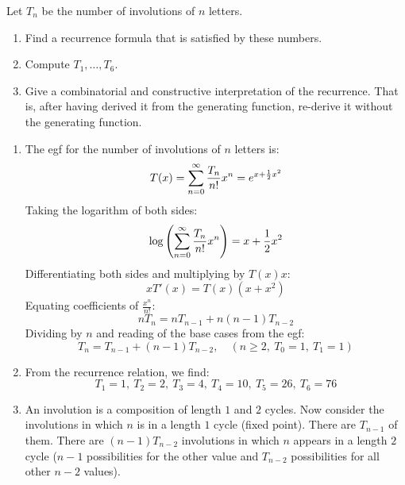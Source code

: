 \begin{exercise}
    \label{ex:3-5}
    Let $T_n$ be the number of involutions of $n$ letters.
    \begin{enumerate}[label=(\alph*)]
        \item Find a recurrence formula that is satisfied by these numbers.
        \item Compute $T_1,\ldots,T_6$.
        \item Give a combinatorial and constructive interpretation of the recurrence. That is, after having derived it from the generating function, re-derive it without the generating function.
    \end{enumerate}
\end{exercise}
\begin{solution}
    \begin{enumerate}[label=(\alph*)]
        \item The egf for the number of involutions of $n$ letters is:
        \[
            T(x) = \bsum[n] \frac{T_n}{n!}x^n = e^{x+\frac{1}{2}x^2}
        \]
        Taking the logarithm of both sides:
        \[
            \log\left( \bsum[n] \frac{T_n}{n!}x^n\right) = x+\frac{1}{2}x^2
        \]
        Differentiating both sides and multiplying by $T(x)x$:
        \[
            xT'(x) = T(x)(x+x^2)
        \]
        Equating coefficients of $\frac{x^n}{n!}$:
        \[
            nT_n = nT_{n-1} + n(n-1)T_{n-2}
        \]
        Dividing by $n$ and reading of the base cases from the egf:
        \[
            T_n = T_{n-1} + (n-1)T_{n-2},\quad (n\geq 2,\ T_0 = 1,\ T_1 = 1)
        \]
        \item From the recurrence relation, we find:
        \[
            T_1 = 1,\ T_2 = 2,\ T_3 = 4,\ T_4 = 10,\ T_5 = 26,\ T_6 = 76
        \]
        \item An involution is a composition of length $1$ and $2$ cycles. Now consider the involutions in which $n$ is in a length $1$ cycle (fixed point). There are $T_{n-1}$ of them. There are $(n-1)T_{n-2}$ involutions in which $n$ appears in a length $2$ cycle ($n-1$ possibilities for the other value and $T_{n-2}$ possibilities for all other $n-2$ values).
    \end{enumerate}
\end{solution}

